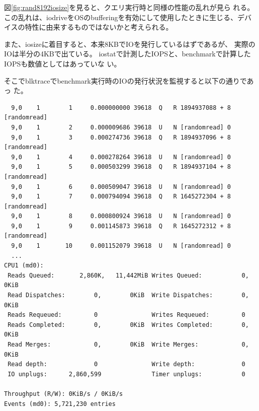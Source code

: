 \documentclass[11pt,a4paper]{jsarticle}
\begin{document}
図\ref{fig:rand8192iosize}を見ると、クエリ実行時と同様の性能の乱れが見ら
れる。
この乱れは、iodriveをOSのbufferingを有効にして使用したときに生じる、デバ
イスの特性に由来するものではないかと考えられる。

また、iosizeに着目すると、本来8KBでIOを発行しているはずであるが、
実際のIOは半分の4KBで出ている。
iostatで計測したIOPSと、benchmarkで計算したIOPSも数値としてはあっていな
い。

そこでblktraceでbenchmark実行時のIOの発行状況を監視すると以下の通りであっ
た。

\clearpage
\begin{verbatim}
  9,0    1        1     0.000000000 39618  Q   R 1894937088 + 8 [randomread]
  9,0    1        2     0.000009686 39618  U   N [randomread] 0
  9,0    1        3     0.000274736 39618  Q   R 1894937096 + 8 [randomread]
  9,0    1        4     0.000278264 39618  U   N [randomread] 0
  9,0    1        5     0.000503299 39618  Q   R 1894937104 + 8 [randomread]
  9,0    1        6     0.000509047 39618  U   N [randomread] 0
  9,0    1        7     0.000794094 39618  Q   R 1645272304 + 8 [randomread]
  9,0    1        8     0.000800924 39618  U   N [randomread] 0
  9,0    1        9     0.001145873 39618  Q   R 1645272312 + 8 [randomread]
  9,0    1       10     0.001152079 39618  U   N [randomread] 0
  ...
CPU1 (md0):
 Reads Queued:       2,860K,   11,442MiB Writes Queued:           0,        0KiB
 Read Dispatches:        0,        0KiB  Write Dispatches:        0,        0KiB
 Reads Requeued:         0               Writes Requeued:         0
 Reads Completed:        0,        0KiB  Writes Completed:        0,        0KiB
 Read Merges:            0,        0KiB  Write Merges:            0,        0KiB
 Read depth:             0               Write depth:             0
 IO unplugs:      2,860,599              Timer unplugs:           0

Throughput (R/W): 0KiB/s / 0KiB/s
Events (md0): 5,721,230 entries
\end{verbatim}
\end{document}
